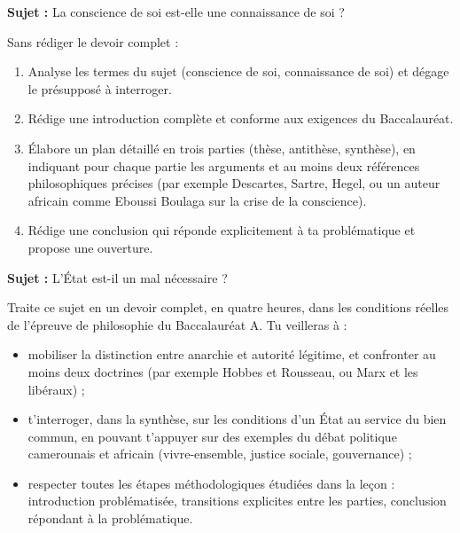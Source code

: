 \documentclass[11pt]{article}
\newcommand{\cle}[1]{{\popxbold\color{popdark}#1}}
\newcounter{popsec}
\newcounter{popsub}
\newcommand{\courssub}[1]{%
  \stepcounter{popsub}%
  \par\vspace{9pt}\noindent{\popxbold\fontsize{11.5}{13}\selectfont\color{popink}{\color{poporange}\thepopsec.\thepopsub}\hspace{6pt}#1}\par\nopagebreak\vspace{4pt}
}
\begin{document}
\courssub{Je me prépare au Bac}

\begin{exercice}
\textbf{Sujet :} \guillemotleft La conscience de soi est-elle une connaissance de soi ? \guillemotright

Sans rédiger le devoir complet :
\begin{enumerate}
\item Analyse les termes du sujet (\cle{conscience de soi}, \cle{connaissance de soi}) et dégage le présupposé à interroger.
\item Rédige une introduction complète et conforme aux exigences du Baccalauréat.
\item Élabore un plan détaillé en trois parties (thèse, antithèse, synthèse), en indiquant pour chaque partie les arguments et au moins deux références philosophiques précises (par exemple Descartes, Sartre, Hegel, ou un auteur africain comme Eboussi Boulaga sur la crise de la conscience).
\item Rédige une conclusion qui réponde explicitement à ta problématique et propose une ouverture.
\end{enumerate}
\end{exercice}

\begin{exercice}
\textbf{Sujet :} \guillemotleft L'État est-il un mal nécessaire ? \guillemotright

Traite ce sujet en un devoir complet, en quatre heures, dans les conditions réelles de l'épreuve de philosophie du Baccalauréat A. Tu veilleras à :
\begin{itemize}
\item mobiliser la distinction entre anarchie et autorité légitime, et confronter au moins deux doctrines (par exemple Hobbes et Rousseau, ou Marx et les libéraux) ;
\item t'interroger, dans la synthèse, sur les conditions d'un État au service du bien commun, en pouvant t'appuyer sur des exemples du débat politique camerounais et africain (vivre-ensemble, justice sociale, gouvernance) ;
\item respecter toutes les étapes méthodologiques étudiées dans la leçon : introduction problématisée, transitions explicites entre les parties, conclusion répondant à la problématique.
\end{itemize}
\end{exercice}
\end{document}

